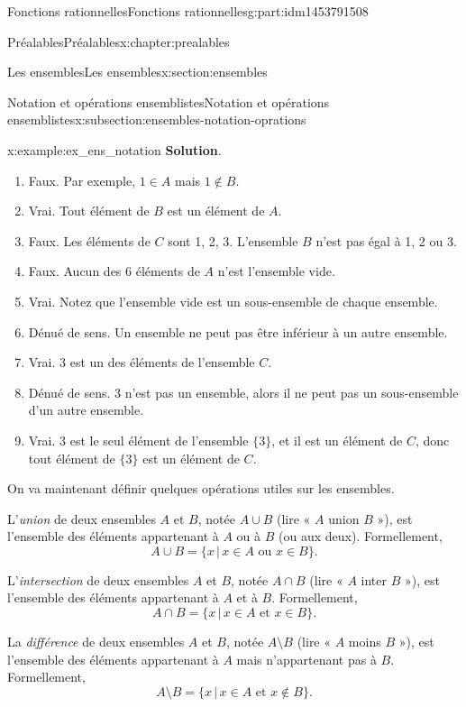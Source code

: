 \documentclass[oneside,10pt,]{book}
\newcommand{\blocktitlefont}{\relax}
\newcommand{\telque}{ \,|\, }
\begin{document}
\begin{partptx}{Fonctions rationnelles}{}{Fonctions rationnelles}{}{}{g:part:idm1453791508}
\begin{chapterptx}{Préalables}{}{Préalables}{}{}{x:chapter:prealables}
\begin{sectionptx}{Les ensembles}{}{Les ensembles}{}{}{x:section:ensembles}
\begin{subsectionptx}{Notation et opérations ensemblistes}{}{Notation et opérations ensemblistes}{}{}{x:subsection:ensembles-notation-oprations}
\begin{example}{}{x:example:ex_ens_notation}
\noindent\textbf{\blocktitlefont Solution}.\hypertarget{g:solution:idm1453753492}{}\quad{}%
\begin{enumerate}
\item{}Faux. Par exemple, \(1\in A\) mais \(1 \notin B\).%
\item{}Vrai. Tout élément de \(B\) est un élément de \(A\).%
\item{}Faux. Les éléments de \(C\) sont 1, 2, 3. L'ensemble \(B\) n'est pas égal à 1, 2 ou 3.%
\item{}Faux. Aucun des 6 éléments de \(A\) n'est l'ensemble vide.%
\item{}Vrai. Notez que l'ensemble vide est un sous-ensemble de chaque ensemble.%
\item{}Dénué de sens. Un ensemble ne peut pas être inférieur à un autre ensemble.%
\item{}Vrai. \(3\) est un des éléments de l'ensemble \(C\).%
\item{}Dénué de sens. \(3\) n'est pas un ensemble, alors il ne peut pas un sous-ensemble d'un autre ensemble.%
\item{}Vrai. \(3\) est le seul élément de l'ensemble \(\{3\}\), et il est un élément de \(C\), donc tout élément de \(\{3\}\) est un élément de \(C\).%
\end{enumerate}
%
\end{example}
On va maintenant définir quelques opérations utiles sur les ensembles.%
\par
L'\emph{union} de deux ensembles \(A\) et \(B\), notée \(A \cup B\) (lire « \(A\) union \(B\) »), est l'ensemble des éléments appartenant à \(A\) ou à \(B\) (ou aux deux). Formellement,%
\begin{equation*}
A \cup B = \{x \telque x\in A \text{ ou } x \in B \}.
\end{equation*}
%
\par
L'\emph{intersection} de deux ensembles \(A\) et \(B\), notée \(A \cap B\) (lire « \(A\) inter \(B\) »), est l'ensemble des éléments appartenant à \(A\) et à \(B\). Formellement,%
\begin{equation*}
A \cap B = \{x \telque x\in A \text{ et } x \in B \}.
\end{equation*}
%
\par
La \emph{différence} de deux ensembles \(A\) et \(B\), notée \(A \setminus B\) (lire « \(A\) moins \(B\) »), est l'ensemble des éléments appartenant à \(A\) mais n'appartenant pas à \(B\). Formellement,%
\begin{equation*}
A \setminus B = \{x \telque x\in A \text{ et } x \notin B \}.

\end{equation*}
\end{subsectionptx}
\end{sectionptx}
\end{chapterptx}
\end{partptx}
\end{document}
